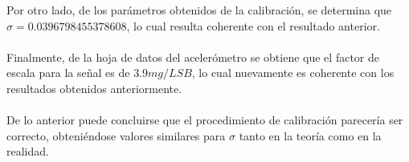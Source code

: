 \documentclass[main]{subfiles}
\begin{document}
Por otro lado, de los parámetros obtenidos de la calibración, se determina que $\sigma= 0.0396798455378608$, lo cual resulta coherente con el resultado anterior.\\
\\
Finalmente, de la hoja de datos del acelerómetro se obtiene que el factor de escala para la señal es de $3.9 mg/LSB$, lo cual nuevamente es coherente con los resultados obtenidos anteriormente.\\
\\
De lo anterior puede concluirse que el procedimiento de calibración parecería ser correcto, obteniéndose valores similares para $\sigma$ tanto en la teoría como en la realidad.
\end{document}

